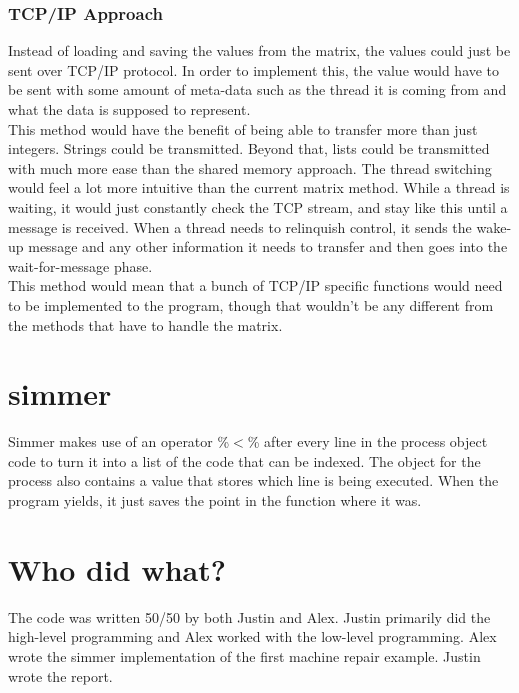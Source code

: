 \documentclass[fleqn]{article}
\begin{document}
\subsubsection{TCP/IP Approach}
Instead of loading and saving the values from the matrix, the values could just be sent over TCP/IP protocol. In order to implement this, the value would have to be sent with some amount of meta-data such as the thread it is coming from and what the data is supposed to represent.\\

This method would have the benefit of being able to transfer more than just integers. Strings could be transmitted. Beyond that, lists could be transmitted with much more ease than the shared memory approach. The thread switching would feel a lot more intuitive than the current matrix method. While a thread is waiting, it would just constantly check the TCP stream, and stay like this until a message is received. When a thread needs to relinquish control, it sends the wake-up message and any other information it needs to transfer and then goes into the wait-for-message phase.\\

This method would mean that a bunch of TCP/IP specific functions would need to be implemented to the program, though that wouldn't be any different from the methods that have to handle the matrix.

\section{simmer}
Simmer makes use of an operator \%$<$\% after every line in the process object code to turn it into a list of the code that can be indexed. The object for the process also contains a value that stores which line is being executed. When the program yields, it just saves the point in the function where it was.



\section{Who did what?}
The code was written 50/50 by both Justin and Alex. Justin primarily did the high-level programming and Alex worked with the low-level programming. Alex wrote the simmer implementation of the first machine repair example. Justin wrote the report.
\end{document}
